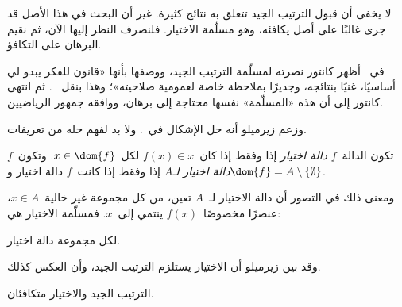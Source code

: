 \documentclass[../../../include/open-logic-section]{subfiles}
\begin{document}

لا يخفى أن قبول الترتيب الجيد تتعلق به نتائج كثيرة. غير أن البحث في
هذا الأصل قد جرى غالبًا على أصل يكافئه، وهو مسلّمة الاختيار. فلنصرف
النظر إليها الآن، ثم نقيم البرهان على التكافؤ.

في~\citeyear{Cantor1883} أظهر كانتور نصرته لمسلّمة الترتيب الجيد،
ووصفها بأنها «قانون للفكر يبدو لي أساسيًا، غنيًا بنتائجه، وجديرًا
بملاحظة خاصة لعمومية صلاحيته»؛ وهذا بنقل~\citeauthor{Potter2004}
\citeyear[p.~243]{Potter2004}. ثم انتهى كانتور إلى أن هذه «المسلّمة»
نفسها محتاجة إلى برهان، ووافقه جمهور الرياضيين.

وزعم زيرميلو أنه حل الإشكال في~\citeyear{Zermelo1904}. ولا بد لفهم
حله من تعريفات.

\begin{defn}
تكون الدالة~$f$ \emph{دالة اختيار} إذا وفقط إذا كان~$f(x) \in x$
لكل~$x \in \dom{f}$. وتكون~$f$ \emph{دالة اختيار لـ$A$} إذا وفقط
إذا كانت~$f$ دالة اختيار و$\dom{f} = A \setminus \{\emptyset\}$.
\end{defn}

ومعنى ذلك في التصور أن دالة الاختيار لـ~$A$ تعين، من كل مجموعة غير
خالية~$x \in A$، عنصرًا مخصوصًا~$f(x)$ ينتمي إلى~$x$. فمسلّمة
الاختيار هي:

\begin{axiom}[الاختيار]
	لكل مجموعة دالة اختيار.
\end{axiom}

وقد بين زيرميلو أن الاختيار يستلزم الترتيب الجيد، وأن العكس كذلك.

\begin{thm}[في $\ZF$]
الترتيب الجيد والاختيار متكافئان.
\end{thm}
\end{document}
